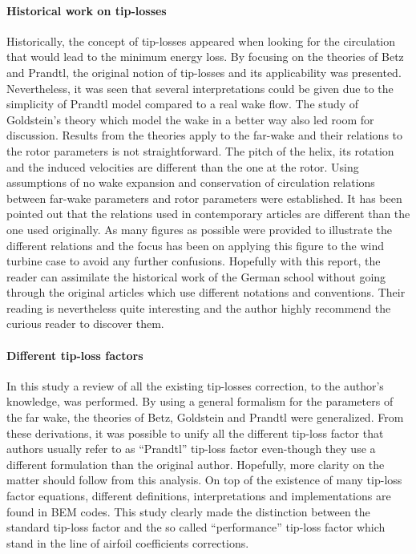 \documentclass[a4paper,11pt]{book}
\begin{document}
\paragraph{Historical work on tip-losses} Historically, the concept of tip-losses appeared when looking for the circulation that would lead to the minimum energy loss. By focusing on the theories of Betz and Prandtl, the original notion of tip-losses and its applicability was presented. Nevertheless, it was seen that several interpretations could be given due to the simplicity of Prandtl model compared to a real wake flow. The study of Goldstein's theory which model the wake in a better way also led room for discussion. Results from the theories apply to the far-wake and their relations to the rotor parameters is not straightforward. The pitch of the helix, its rotation and the induced velocities are different than the one at the rotor. Using assumptions of no wake expansion and conservation of circulation relations between far-wake parameters and rotor parameters were established. It has been pointed out that the relations used in contemporary articles are different than the one used originally. As many figures as possible were provided to illustrate the different relations and the focus has been on applying this figure to the wind turbine case to avoid any further confusions. Hopefully with this report, the reader can assimilate the historical work of the German school without going through the original articles which use different notations and conventions. Their reading is nevertheless quite interesting and the author highly recommend the curious reader to discover them. 

\paragraph{Different tip-loss factors} In this study a review of all the existing tip-losses correction, to the author's knowledge, was performed. By using a general formalism for the parameters of the far wake, the theories of Betz, Goldstein and Prandtl were generalized. From these derivations, it was possible to unify all the different tip-loss factor that authors usually refer to as ``Prandtl'' tip-loss factor even-though they use a different formulation than the original author. Hopefully, more clarity on the matter should follow from this analysis. On top of the existence of many tip-loss factor equations, different definitions, interpretations and implementations are found in BEM codes. This study clearly made the distinction between the standard tip-loss factor and the so called ``performance'' tip-loss factor which stand in the line of airfoil coefficients corrections. 
\end{document}
